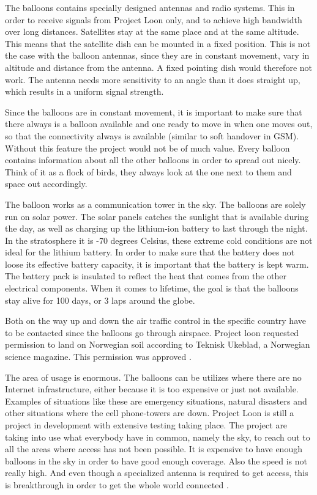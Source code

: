 The balloons contains specially designed antennas and radio systems. This in order to receive signals from Project Loon only, and to achieve high bandwidth over long distances. Satellites stay at the same place and at the same altitude. This means that the satellite dish can be mounted in a fixed position. This is not the case with the balloon antennas, since they are in constant movement, vary in altitude and distance from the antenna. A fixed pointing dish would therefore not work. The antenna needs more sensitivity to an angle than it does straight up, which results in a uniform signal strength. 

Since the balloons are in constant movement, it is important to make sure that there always is a balloon available and one ready to move in when one moves out, so that the connectivity always is available (similar to soft handover in GSM). Without this feature the project would not be of much value. Every balloon contains information about all the other balloons in order to spread out nicely. Think of it as a flock of birds, they always look at the one next to them and space out accordingly.

The balloon works as a communication tower in the sky. The balloons are solely run on solar power. The solar panels catches the sunlight that is available during the day, as well as charging up the lithium-ion battery to last through the night. In the stratosphere it is -70 degrees Celsius, these extreme cold conditions are not ideal for the lithium battery. In order to make sure that the battery does not loose its effective battery capacity, it is important that the battery is kept warm. The battery pack is insulated to reflect the heat that comes from the other electrical components. When it comes to lifetime, the goal is that the balloons stay alive for 100 days, or 3 laps around the globe. 

Both on the way up and down the air traffic control in the specific country have to be contacted since the balloons go through airspace. Project loon requested permission to land on Norwegian soil according to Teknisk Ukeblad, a Norwegian science magazine. This permission was approved \cite{loonTU}.

The area of usage is enormous. The balloons can be utilizes where there are no Internet infrastructure, either because it is too expensive or just not available. Examples of situations like these are emergency situations, natural disasters and other situations where the cell phone-towers are down. Project Loon is still a project in development with extensive testing taking place. The project are taking into use what everybody have in common, namely the sky, to reach out to all the areas where access has not been possible. It is expensive to have enough balloons in the sky in order to have good enough coverage. Also the speed is not really high. And even though a specialized antenna is required to get access, this is breakthrough in order to get the whole world connected \cite{loonYouTube, loonNorsk}.

